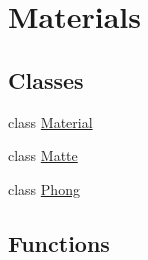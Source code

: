 \hypertarget{group___materials}{}\section{Materials}
\label{group___materials}
\subsection*{Classes}
\begin{DoxyCompactItemize}
\item 
class \hyperlink{class_material}{Material}
\item 
class \hyperlink{class_matte}{Matte}
\item 
class \hyperlink{class_phong}{Phong}
\end{DoxyCompactItemize}
\subsection*{Functions}
